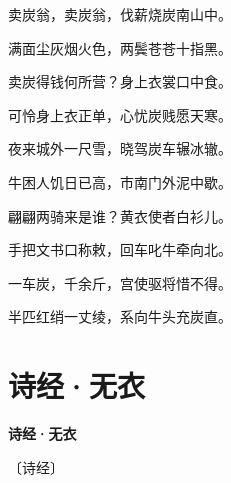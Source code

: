 \documentclass[12pt,UTF-8,openany,fontset=none]{ctexbook}
\begin{document}
\begin{center}
    \begin{Large}

        卖炭翁，卖炭翁，伐薪烧炭南山中。

        满面尘灰烟火色，两鬓苍苍十指黑。

        卖炭得钱何所营？身上衣裳口中食。

        可怜身上衣正单，心忧炭贱愿天寒。

        夜来城外一尺雪，晓驾炭车辗冰辙。

        牛困人饥日已高，市南门外泥中歇。

        翩翩两骑来是谁？黄衣使者白衫儿。

        手把文书口称敕，回车叱牛牵向北。

        一车炭，千余斤，宫使驱将惜不得。

        半匹红绡一丈绫，系向牛头充炭直。

    \end{Large}

\end{center}

\vspace{8pt}
\clearpage

\section{诗经·无衣}


\begin{center}
    {\bfseries 诗经·无衣}

    \vspace{18pt}

    \begin{large}\xuwen
        〔诗经〕
    \end{large}

\end{center}

    \vspace{18pt}  %
\end{document}
